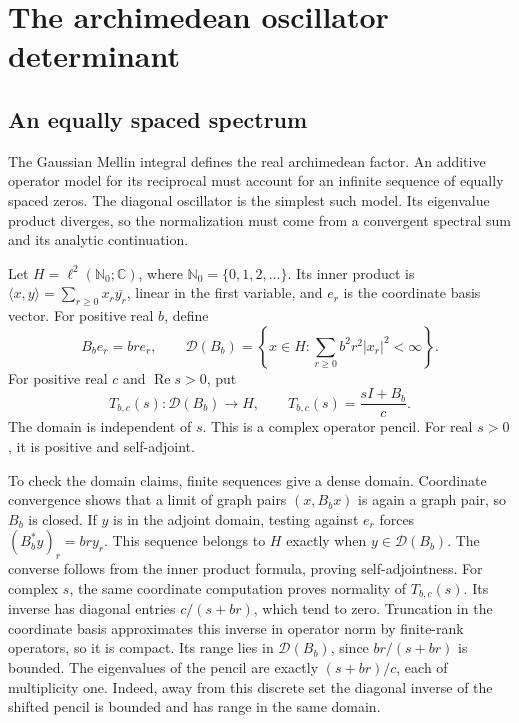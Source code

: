 \section{The archimedean oscillator determinant}
\label{sec:oscillator}

\subsection{An equally spaced spectrum}

The Gaussian Mellin integral defines the real archimedean factor.
An additive operator model for its reciprocal must account for an infinite
sequence of equally spaced zeros. The diagonal oscillator is the simplest
such model. Its eigenvalue product diverges, so the normalization must come
from a convergent spectral sum and its analytic continuation.

Let \(H=\ell^2(\mathbb N_0;\mathbb C)\), where
\(\mathbb N_0=\{0,1,2,\ldots\}\). Its inner product is
\(\langle x,y\rangle=\sum_{r\geq0}x_r\overline{y_r}\), linear in
the first variable, and \(e_r\) is the coordinate basis vector.
For positive real \(b\), define
\[
 B_b e_r=br e_r,\qquad
 \mathcal D(B_b)=
 \left\{x\in H:\sum_{r\geq0}b^2r^2|x_r|^2<\infty\right\}.
\]
For positive real \(c\) and \(\operatorname{Re}s>0\), put
\[
 T_{b,c}(s):\mathcal D(B_b)\longrightarrow H,
 \qquad T_{b,c}(s)=\frac{sI+B_b}{c}.
\]
The domain is independent of \(s\). This is a complex operator pencil.
For real \(s>0\), it is positive and self-adjoint.

To check the domain claims, finite sequences give a dense domain.
Coordinate convergence shows that a limit of graph pairs \((x,B_bx)\)
is again a graph pair, so \(B_b\) is closed.
If \(y\) is in the adjoint domain, testing against \(e_r\) forces
\((B_b^*y)_r=br y_r\). This sequence belongs to \(H\) exactly when
\(y\in\mathcal D(B_b)\). The converse follows from the inner product
formula, proving self-adjointness.
For complex \(s\), the same coordinate computation proves normality of
\(T_{b,c}(s)\). Its inverse has diagonal entries \(c/(s+br)\),
which tend to zero. Truncation in the coordinate basis approximates this
inverse in operator norm by finite-rank operators, so it is compact.
Its range lies in \(\mathcal D(B_b)\), since \(br/(s+br)\) is bounded.
The eigenvalues of the pencil are exactly \((s+br)/c\), each of multiplicity
one. Indeed, away from this discrete set the diagonal inverse of the
shifted pencil is bounded and has range in the same domain.

